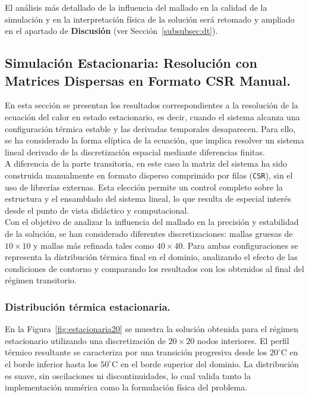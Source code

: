 \documentclass{article}
\begin{document}
\noindent
El análisis más detallado de la influencia del mallado en la calidad de la simulación y en la interpretación física de la solución será retomado y ampliado en el apartado de \textbf{Discusión} (ver Sección~\ref{subsubsec:dt}).

\newpage
\subsection{Simulación Estacionaria: Resolución con Matrices Dispersas en Formato CSR Manual.}
\label{subsubsec:re}
En esta sección se presentan los resultados correspondientes a la resolución de la ecuación del calor en estado estacionario, es decir, cuando el sistema alcanza una configuración térmica estable y las derivadas temporales desaparecen. Para ello, se ha considerado la forma elíptica de la ecuación, que implica resolver un sistema lineal derivado de la discretización espacial mediante diferencias finitas.\\

A diferencia de la parte transitoria, en este caso la matriz del sistema ha sido construida manualmente en formato disperso comprimido por filas (\texttt{CSR}), sin el uso de librerías externas. Esta elección permite un control completo sobre la estructura y el ensamblado del sistema lineal, lo que resulta de especial interés desde el punto de vista didáctico y computacional.\\

Con el objetivo de analizar la influencia del mallado en la precisión y estabilidad de la solución, se han considerado diferentes discretizaciones: mallas gruesas de $10 \times 10$ y mallas más refinada tales como $40 \times 40$. Para ambas configuraciones se representa la distribución térmica final en el dominio, analizando el efecto de las condiciones de contorno y comparando los resultados con los obtenidos al final del régimen transitorio.

\subsubsection{Distribución térmica estacionaria.}
En la Figura~\ref{fig:estacionaria20} se muestra la solución obtenida para el régimen estacionario utilizando una discretización de $20 \times 20$ nodos interiores. El perfil térmico resultante se caracteriza por una transición progresiva desde los $20^\circ$C en el borde inferior hasta los $50^\circ$C en el borde superior del dominio. La distribución es suave, sin oscilaciones ni discontinuidades, lo cual valida tanto la implementación numérica como la formulación física del problema.\\
\end{document}

